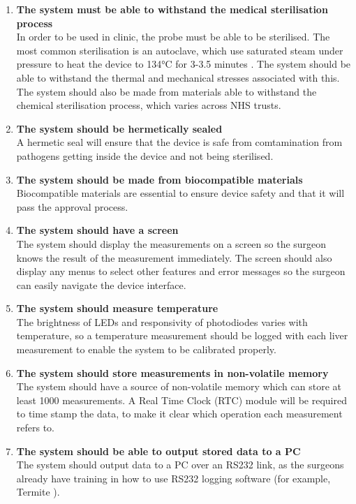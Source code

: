 \begin{enumerate}
\item \label{req: sterilise} \textbf{The system must be able to withstand the medical sterilisation process}\\
In order to be used in clinic, the probe must be able to be sterilised. The most common sterilisation is an autoclave, which use saturated steam under pressure to heat the device to 134\si{\celsius} for 3-3.5 minutes \cite{nhs_autoclave}. The system should be able to withstand the thermal and mechanical stresses associated with this. The system should also be made from materials able to withstand the chemical sterilisation process, which varies across NHS trusts.

\item \label{req: seal} \textbf{The system should be hermetically sealed}\\
A hermetic seal will ensure that the device is safe from comtamination from pathogens getting inside the device and not being sterilised. 

\item \label{req: biocompatible} \textbf{The system should be made from biocompatible materials}\\
Biocompatible materials are essential to ensure device safety and that it will pass the approval process.




\item \label{req: screen} \textbf{The system should have a screen}\\
The system should display the measurements on a screen so the surgeon knows the result of the measurement immediately. The screen should also display any menus to select other features and error messages so the surgeon can easily navigate the device interface.

\item \label{req: temperature} \textbf{The system should measure temperature}\\
The brightness of LEDs and responsivity of photodiodes varies with temperature, so a temperature measurement should be logged with each liver measurement to enable the system to be calibrated properly.

\item \label{req: memory} \textbf{The system should store measurements in non-volatile memory}\\
The system should have a source of non-volatile memory which can store at least 1000 measurements. A Real Time Clock (RTC) module will be required to time stamp the data, to make it clear which operation each measurement refers to.

\item \label{req: rs232} \textbf{The system should be able to output stored data to a PC}\\
The system should output data to a PC over an RS232 link, as the surgeons already have training in how to use RS232 logging software (for example, Termite \cite{termite}).


\end{enumerate}